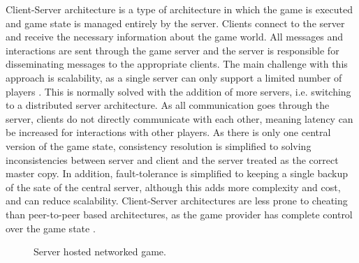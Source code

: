Client-Server architecture is a type of architecture in which the game is executed and game state is managed entirely by the server. Clients connect to the server and receive the necessary information about the game world. All messages and interactions are sent through the game server and the server is responsible for disseminating messages to the appropriate clients. The main challenge with this approach is scalability, as a single server can only support a limited number of players \cite{Ferretti2018}. This is normally solved with the addition of more servers, i.e. switching to a distributed server architecture. As all communication goes through the server, clients do not directly communicate with each other, meaning latency can be increased for interactions with other players.
As there is only one central version of the game state, consistency resolution is simplified to solving inconsistencies between server and client and the server treated as the correct master copy. In addition, fault-tolerance is simplified to keeping a single backup of the sate of the central server, although this adds more complexity and cost, and can reduce scalability. Client-Server architectures are less prone to cheating than peer-to-peer based architectures, as the game provider has complete control over the game state \cite{P2PForMMOs}.

\begin{figure}
	\centering
	
	\caption{Server hosted networked game.}
\end{figure}

%
%	


